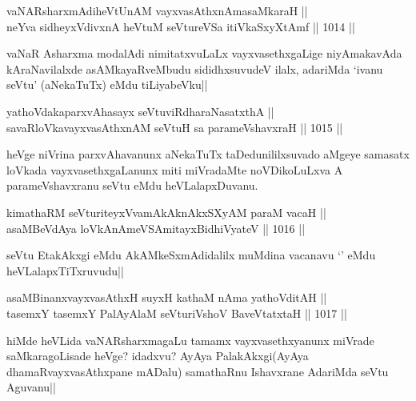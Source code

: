 \begin{shl}
vaNARsharxmAdiheVtUnAM vayxvasAthxnAmasaMkaraH || \\
neYva sidheyxVdivxnA heVtuM seVtureVSa itiVkaSxyXtAmf ||  1014 ||  
\end{shl}

\begin{artha}
vaNaR Asharxma modalAdi nimitatxvuLaLx vayxvasethxgaLige niyAmakavAda kAraNavilalxde asAMkayaRveMbudu sididhxsuvudeV ilalx, adariMda `ivanu seVtu' (aNekaTuTx) eMdu tiLiyabeVku||
\end{artha}


\begin{shl}
yathoVdakaparxvAhasayx seVtuviRdharaNasatxthA || \\
savaRloVkavayxvasAthxnAM seVtuH sa parameVshavxraH ||  1015 ||  
\end{shl}

\begin{artha}
heVge niVrina parxvAhavanunx aNekaTuTx taDedunililxsuvado aMgeye samasatx loVkada vayxvasethxgaLanunx miti miVradaMte noVDikoLuLxva A parameVshavxranu seVtu eMdu heVLalapxDuvanu.
\end{artha}

\begin{shl}
kimathaRM seVturiteyxVvamAkAknAkxSXyAM paraM vacaH || \\
asaMBeVdAya loVkAnAmeVSAmitayxBidhiVyateV ||  1016 ||  
\end{shl}

\begin{artha}
seVtu EtakAkxgi eMdu AkAMkeSxmAdidalilx muMdina vacanavu `\stext' eMdu heVLalapxTiTxruvudu||
\end{artha}

\begin{shl}
asaMBinanxvayxvasAthxH suyxH kathaM nAma yathoVditAH || \\
tasemxY tasemxY PalAyAlaM seVturiVshoV BaveVtatxtaH ||  1017 ||  
\end{shl}

\begin{artha}
hiMde heVLida vaNARsharxmagaLu tamamx vayxvasethxyanunx miVrade saMkaragoLisade heVge? idadxvu? AyAya PalakAkxgi(AyAya dhamaRvayxvasAthxpane mADalu) samathaRnu Ishavxrane AdariMda seVtu Aguvanu||
\end{artha}


